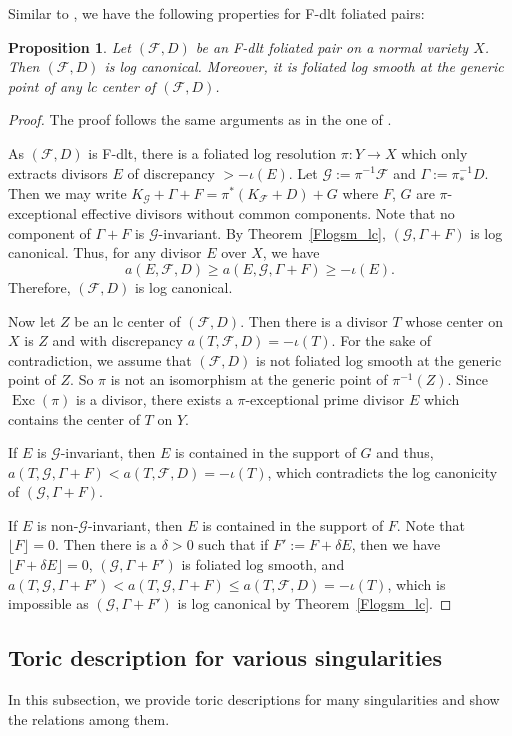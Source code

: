 \documentclass[12pt,reqno]{amsart}
\newtheorem{proposition}[theorem]{Proposition}
\theoremstyle{definition}
\newcommand{\on}{\operatorname}
\newcommand\cF{{\mathcal{F}}}
\newcommand\cG{{\mathcal{G}}}
\begin{document}
Similar to \cite[Remark 3.7 and Lemma 3.8]{CS}, we have the following properties for F-dlt foliated pairs:
\begin{proposition}\label{F_dlt_property}
    Let $(\cF,D)$ be an F-dlt foliated pair on a normal variety $X$. 
    Then $(\cF,D)$ is log canonical. 
    Moreover, it is foliated log smooth at the generic point of any lc center of $(\cF,D)$. 
\end{proposition}
\begin{proof}
    The proof follows the same arguments as in the one of \cite[Remark 3.7 and Lemma 3.8]{CS}. 

    As $(\cF,D)$ is F-dlt, there is a foliated log resolution $\pi\colon Y\to X$ which only extracts divisors $E$ of discrepancy $>-\iota(E)$. 
    Let $\cG:=\pi^{-1}\cF$ and $\Gamma:=\pi_*^{-1}D$. 
    Then we may write $K_\cG+\Gamma+F = \pi^*(K_\cF+D)+G$ where $F$, $G$ are $\pi$-exceptional effective divisors without common components. 
    Note that no component of $\Gamma+F$ is $\cG$-invariant. 
    By Theorem~\ref{Flogsm_lc}, $(\cG,\Gamma+F)$ is log canonical. 
    Thus, for any divisor $E$ over $X$, we have 
    \[a(E,\cF,D)\geq a(E,\cG,\Gamma+F)\geq -\iota(E).\]
    Therefore, $(\cF,D)$ is log canonical. 

    Now let $Z$ be an lc center of $(\cF,D)$. 
    Then there is a divisor $T$ whose center on $X$ is $Z$ and with discrepancy $a(T,\cF,D)=-\iota(T)$. 
    For the sake of contradiction, we assume that $(\cF,D)$ is not foliated log smooth at the generic point of $Z$. 
    So $\pi$ is not an isomorphism at the generic point of $\pi^{-1}(Z)$. 
    Since $\on{Exc}(\pi)$ is a divisor, there exists a $\pi$-exceptional prime divisor $E$ which contains the center of $T$ on $Y$. 
    
    If $E$ is $\cG$-invariant, then $E$ is contained in the support of $G$ and thus, $a(T,\cG,\Gamma+F) < a(T,\cF,D)=-\iota(T)$, which contradicts the log canonicity of $(\cG,\Gamma+F)$. 

    If $E$ is non-$\cG$-invariant, then $E$ is contained in the support of $F$. 
    Note that $\lfloor F\rfloor=0$. 
    Then there is a $\delta>0$ such that if $F':= F+\delta E$, then we have $\lfloor F+\delta E\rfloor=0$, $(\cG,\Gamma+F')$ is foliated log smooth, and $a(T,\cG,\Gamma+F')<a(T,\cG,\Gamma+F)\leq a(T,\cF,D)=-\iota(T)$, which is impossible as $(\cG,\Gamma+F')$ is log canonical by Theorem~\ref{Flogsm_lc}. 
\end{proof}


\subsection{Toric description for various singularities}
In this subsection, we provide toric descriptions for many singularities and show the relations among them. 
\end{document}
